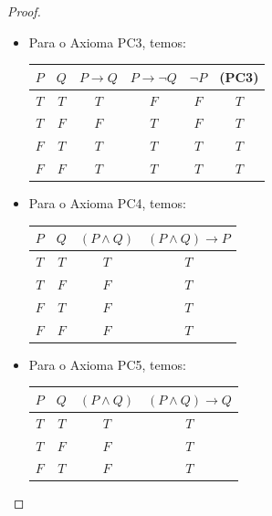 \begin{proof}
\begin{itemize}
\begin{center}
\begin{tabular}{c|c|c|c|c|c}
                $F$ & $T$ & $T$ & $T$ & $T$ & $T$ \\
                $F$ & $T$ & $F$ & $T$ & $T$ & $T$ \\
                $F$ & $F$ & $T$ & $T$ & $T$ & $T$ \\
                $F$ & $F$ & $F$ & $T$ & $T$ & $T$
            \end{tabular}
        \end{center}
        \item Para o Axioma PC3, temos:
        \begin{center}
            \begin{tabular}{c|c|c|c|c|c}
                $P$ & $Q$ & $P \rightarrow Q$ & $P \rightarrow \neg Q$ & $\neg P$ & (PC3) \\
                \hline
                $T$ & $T$ & $T$ & $F$ & $F$ & $T$ \\
                $T$ & $F$ & $F$ & $T$ & $F$ & $T$ \\
                $F$ & $T$ & $T$ & $T$ & $T$ & $T$ \\
                $F$ & $F$ & $T$ & $T$ & $T$ & $T$
            \end{tabular}
        \end{center}
        \item Para o Axioma PC4, temos:
        \begin{center}
            \begin{tabular}{c|c|c|c}
                $P$ & $Q$ & $(P \land Q)$ & $(P \land Q) \rightarrow P$ \\
                \hline
                $T$ & $T$ & $T$ & $T$ \\
                $T$ & $F$ & $F$ & $T$ \\
                $F$ & $T$ & $F$ & $T$ \\
                $F$ & $F$ & $F$ & $T$
            \end{tabular}
        \end{center}
        \item Para o Axioma PC5, temos:
        \begin{center}
            \begin{tabular}{c|c|c|c}
                $P$ & $Q$ & $(P \land Q)$ & $(P \land Q) \rightarrow Q$ \\
                \hline
                $T$ & $T$ & $T$ & $T$ \\
                $T$ & $F$ & $F$ & $T$ \\
                $F$ & $T$ & $F$ & $T$ \\

\end{tabular}
\end{center}
\end{itemize}
\end{proof}
